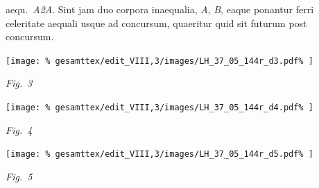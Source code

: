 % 
aequ.\ \textit{A{\scriptsize2}A}.
\pend \pstart
Sint jam duo corpora inaequalia,%
\protect{} \textit{A}, \textit{B}, eaque ponantur ferri celeritate aequali%
\protect{} usque ad
concursum,\protect{} quaeritur quid sit futurum post concursum\protect{}.
\pend
%
\vspace{2.0em} %
\centerline{%
\texttt{[image: \%
gesamttex/edit\_VIII,3/images/LH\_37\_05\_144r\_d3.pdf\%
]}} 
\vspace{0.5em}
\centerline{%
\lbrack\textit{Fig.~3}\rbrack%
}
\newpage%
%
%
\centerline{%
\texttt{[image: \%
gesamttex/edit\_VIII,3/images/LH\_37\_05\_144r\_d4.pdf\%
]}} 
\vspace{0.5em}
\centerline{%
\lbrack\textit{Fig.~4}\rbrack%
}
\vspace{2.0em}
%
\centerline{%
\texttt{[image: \%
gesamttex/edit\_VIII,3/images/LH\_37\_05\_144r\_d5.pdf\%
]}}
\vspace{0.5em}
\centerline{%
\lbrack\textit{Fig.~5}\rbrack%
}
\vspace{1.0em}

